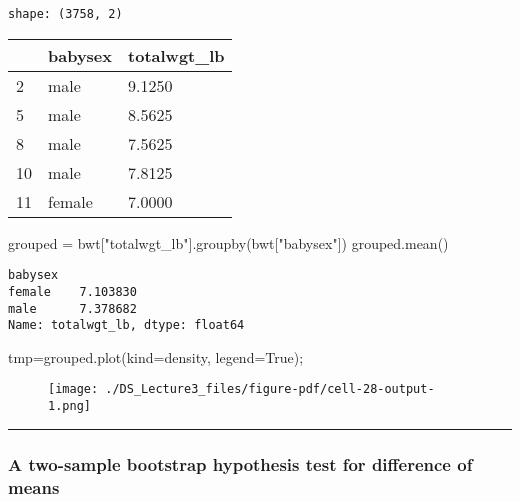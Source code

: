 \documentclass[
  letterpaper,
  DIV=11,
  numbers=noendperiod]{scrreprt}
\newenvironment{Shaded}{\begin{snugshade}}{\end{snugshade}}
\newcommand{\NormalTok}[1]{\textcolor[rgb]{0.00,0.23,0.31}{#1}}
\newcommand{\OperatorTok}[1]{\textcolor[rgb]{0.37,0.37,0.37}{#1}}
\newcommand{\StringTok}[1]{\textcolor[rgb]{0.13,0.47,0.30}{#1}}
\newcommand{\VariableTok}[1]{\textcolor[rgb]{0.07,0.07,0.07}{#1}}
\begin{document}
\begin{verbatim}
shape: (3758, 2)
\end{verbatim}

\begin{longtable}[]{@{}lll@{}}
\toprule()
& babysex & totalwgt\_lb \\
\midrule()
\endhead
2 & male & 9.1250 \\
5 & male & 8.5625 \\
8 & male & 7.5625 \\
10 & male & 7.8125 \\
11 & female & 7.0000 \\
\bottomrule()
\end{longtable}

\begin{Shaded}
\begin{Highlighting}[]
\NormalTok{grouped }\OperatorTok{=}\NormalTok{ bwt[}\StringTok{"totalwgt\_lb"}\NormalTok{].groupby(bwt[}\StringTok{"babysex"}\NormalTok{])}
\NormalTok{grouped.mean()}
\end{Highlighting}
\end{Shaded}

\begin{verbatim}
babysex
female    7.103830
male      7.378682
Name: totalwgt_lb, dtype: float64
\end{verbatim}

\begin{Shaded}
\begin{Highlighting}[]
\NormalTok{tmp}\OperatorTok{=}\NormalTok{grouped.plot(kind}\OperatorTok{=}\StringTok{\textquotesingle{}density\textquotesingle{}}\NormalTok{, legend}\OperatorTok{=}\VariableTok{True}\NormalTok{)}\OperatorTok{;}
\end{Highlighting}
\end{Shaded}

\begin{figure}[H]

{\centering \texttt{[image: ./DS\_Lecture3\_files/figure-pdf/cell-28-output-1.png]}

}

\end{figure}

\begin{center}\rule{0.5\linewidth}{0.5pt}\end{center}

\hypertarget{a-two-sample-bootstrap-hypothesis-test-for-difference-of-means}{%
\subsubsection{A two-sample bootstrap hypothesis test for difference of
means}\label{a-two-sample-bootstrap-hypothesis-test-for-difference-of-means}}
\end{document}
